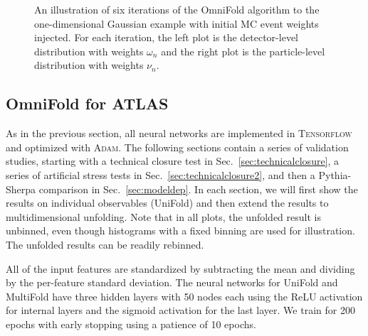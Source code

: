\begin{figure}[h!]
\caption{An illustration of six iterations of the OmniFold algorithm to the one-dimensional Gaussian example with initial MC event weights injected.  For each iteration, the left plot is the detector-level distribution with weights $\omega_n$ and the right plot is the particle-level distribution with weights $\nu_n$.}
\label{fig:gaussian:MCiterations}
\end{figure}

\clearpage

\subsection{OmniFold for ATLAS}

As in the previous section, all neural networks are implemented in \textsc{Tensorflow} and optimized with \textsc{Adam}.  The following sections contain a series of validation studies, starting with a technical closure test in Sec.~\ref{sec:technicalclosure}, a series of artificial stress tests in Sec.~\ref{sec:technicalclosure2}, and then a Pythia-Sherpa comparison in Sec.~\ref{sec:modeldep}.  In each section, we will first show the results on individual observables (UniFold) and then extend the results to multidimensional unfolding.  Note that in all plots, the unfolded result is unbinned, even though histograms with a fixed binning are used for illustration.  The unfolded results can be readily rebinned.

All of the input features are standardized by subtracting the mean and dividing by the per-feature standard deviation.  The neural networks for UniFold and MultiFold have three hidden layers with 50 nodes each using the ReLU activation for internal layers and the sigmoid activation for the last layer.  We train for 200 epochs with early stopping using a patience of 10 epochs.

